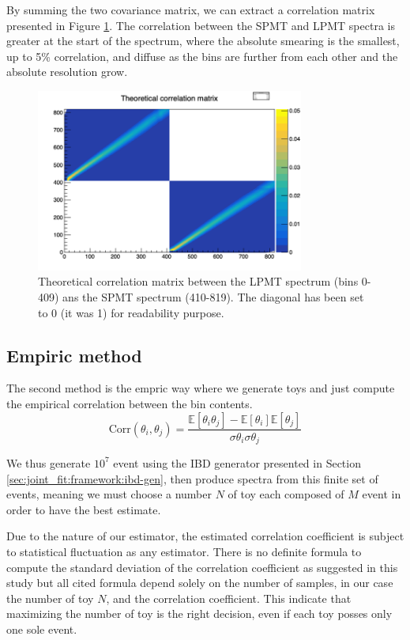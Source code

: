 \documentclass[../main.tex]{subfiles}
\begin{document}
By summing the two covariance matrix, we can extract a correlation matrix presented in Figure \ref{fig:joint_fit:th_cor_mat}. The correlation between the SPMT and LPMT spectra is greater at the start of the spectrum, where the absolute smearing is the smallest, up to 5\% correlation, and diffuse as the bins are further from each other and the absolute resolution grow.

\begin{figure}[ht]
  \centering
  \includegraphics[height=6cm]{images/joint_fit/theoretical_corr.png}
  \caption{Theoretical correlation matrix between the LPMT spectrum (bins 0-409) ans the SPMT spectrum (410-819). The diagonal has been set to 0 (it was 1) for readability purpose.}
  \label{fig:joint_fit:th_cor_mat}
\end{figure}

\subsection{Empiric method}

The second method is the empric way where we generate toys and just compute the empirical correlation between the bin contents.
\begin{equation}
  \mathrm{Corr}(\theta_i, \theta_j) = \frac{\mathbb{E}[\theta_i \theta_j] - \mathbb{E}[\theta_i] \mathbb{E}[\theta_j]}{\sigma \theta_i \sigma \theta_j}
\end{equation}

We thus generate $10^7$ event using the IBD generator presented in Section \ref{sec:joint_fit:framework:ibd-gen}, then produce spectra from this finite set of events, meaning we must choose a number $N$ of toy each composed of $M$ event in order to have the best estimate.

Due to the nature of our estimator, the estimated correlation coefficient is subject to statistical fluctuation as any estimator. There is no definite formula to compute the standard deviation of the correlation coefficient as suggested in this study \cite{gnambs_brief_2023} but all cited formula depend solely on the number of samples, in our case the number of toy $N$, and the correlation coefficient. This indicate that maximizing the number of toy is the right decision, even if each toy posses only one sole event.
\end{document}

